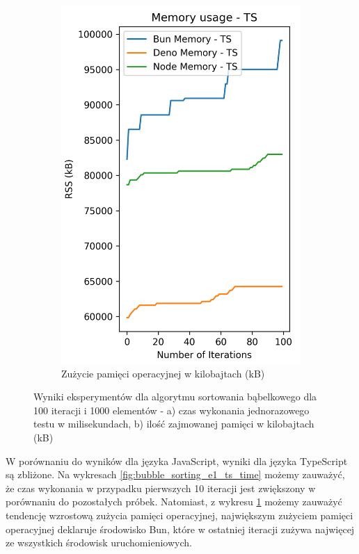 \begin{figure}[H]
\begin{subfigure}[b]{0.44\textwidth}
    \includegraphics[width=\textwidth]{Figures/sorting/sorting_bubble_100_1000_ts_memory.png}
    \caption{Zużycie pamięci operacyjnej w kilobajtach (kB)}
    \label{fig:bubble_sorting_e1_ts_memory}
  \end{subfigure}
  \caption{Wyniki eksperymentów dla algorytmu sortowania bąbelkowego dla 100 iteracji i 1000 elementów - a) czas wykonania jednorazowego testu w milisekundach, b) ilość zajmowanej pamięci w kilobajtach (kB)}
  \label{fig:bubble_sorting_e1_ts}
\end{figure}

W porównaniu do wyników dla języka JavaScript, wyniki dla języka TypeScript są zbliżone. Na wykresach \ref{fig:bubble_sorting_e1_ts_time} możemy zauważyć, że czas wykonania w przypadku pierwszych 10 iteracji jest zwiększony w porównaniu do pozostałych próbek. Natomiast, z wykresu \ref{fig:bubble_sorting_e1_ts_memory} możemy zauważyć tendencję wzrostową zużycia pamięci operacyjnej, największym zużyciem pamięci operacyjnej deklaruje środowisko Bun, które w ostatniej iteracji zużywa najwięcej ze wszystkich środowisk uruchomieniowych.

